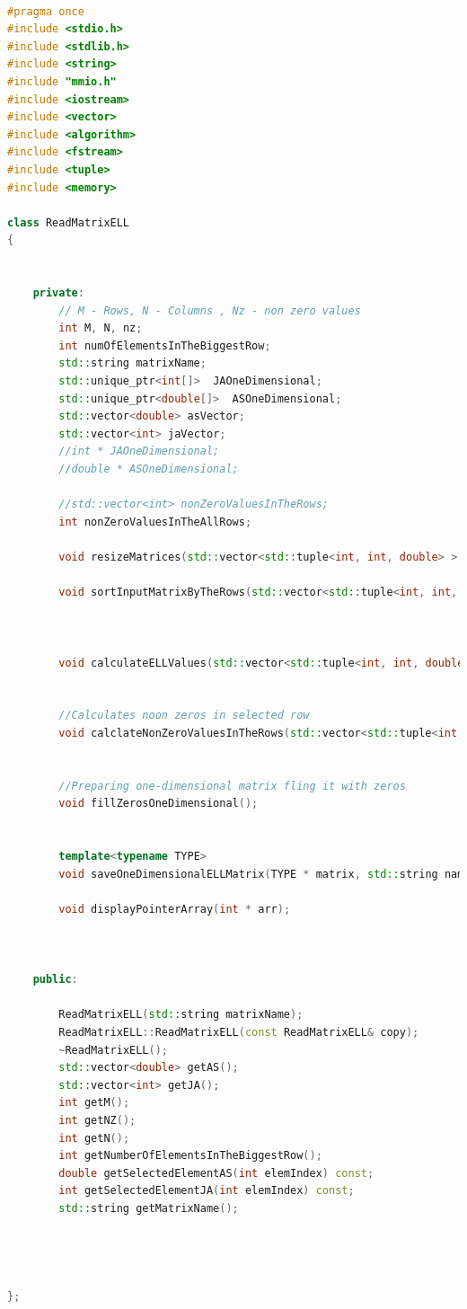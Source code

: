 \documentclass{scrreprt}
\begin{document}
\begin{lstlisting}[language=C++, caption=ReadMatrixELL.h]

#pragma once
#include <stdio.h>
#include <stdlib.h>
#include <string>
#include "mmio.h"
#include <iostream>
#include <vector>
#include <algorithm>
#include <fstream>
#include <tuple>
#include <memory>

class ReadMatrixELL
{


	private:	
		// M - Rows, N - Columns , Nz - non zero values
		int M, N, nz;
		int numOfElementsInTheBiggestRow;
		std::string matrixName;
		std::unique_ptr<int[]>  JAOneDimensional;
		std::unique_ptr<double[]>  ASOneDimensional;
		std::vector<double> asVector;
		std::vector<int> jaVector;
		//int * JAOneDimensional;
		//double * ASOneDimensional;

		//std::vector<int> nonZeroValuesInTheRows;
		int nonZeroValuesInTheAllRows;

		void resizeMatrices(std::vector<std::tuple<int, int, double> > & rowsAndValues);

		void sortInputMatrixByTheRows(std::vector<std::tuple<int, int, double> > & rowsAndValues);


		
		void calculateELLValues(std::vector<std::tuple<int, int, double> > & rowsAndValues, std::vector<int> & nonZeroValuesInTheRows);


		//Calculates noon zeros in selected row
		void calclateNonZeroValuesInTheRows(std::vector<std::tuple<int, int, double> > & rowsAndValues, std::vector<int> & nonZeroValuesInTheRows);
	

		//Preparing one-dimensional matrix fling it with zeros
		void fillZerosOneDimensional();


		template<typename TYPE>
		void saveOneDimensionalELLMatrix(TYPE * matrix, std::string name, std::vector<int> & nonZeroValuesInTheRows);

		void displayPointerArray(int * arr);



	public:

		ReadMatrixELL(std::string matrixName);
		ReadMatrixELL::ReadMatrixELL(const ReadMatrixELL& copy);
		~ReadMatrixELL();
		std::vector<double> getAS();
		std::vector<int> getJA();
		int getM();
		int getNZ();
		int getN();
		int getNumberOfElementsInTheBiggestRow();
		double getSelectedElementAS(int elemIndex) const;
		int getSelectedElementJA(int elemIndex) const;
		std::string getMatrixName();




};





\end{lstlisting}
\end{document}
